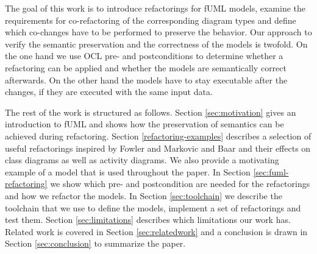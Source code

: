 \documentclass{llncs}
\begin{document}

The goal of this work is to introduce refactorings for fUML models, examine the requirements for co-refactoring of the
corresponding diagram types and define which co-changes have to be performed to preserve the behavior. Our approach to
verify the semantic preservation and the correctness of the models is twofold. On the one hand we use OCL pre- and postconditions
\cite{rob99} to determine whether a refactoring can be applied and whether the models are semantically correct afterwards.
On the other hand the models have to stay executable after the changes, if they are executed with the same input data.



The rest of the work is structured as follows. Section \ref{sec:motivation} gives an introduction to fUML and shows how 
the preservation of semantics can be achieved during refactoring. 
Section \ref{refactoring-examples} describes a selection of useful refactorings inspired by Fowler \cite{fow99} and 
Markovic and Baar \cite{DBLP:journals/sosym/MarkovicB08} and their effects on class diagrams as
well as activity diagrams. We also provide a motivating example of a model that is used throughout the paper. In Section 
\ref{sec:fuml-refactoring} we show which pre- and postcondition are needed for the refactorings and
how we refactor the models. In Section \ref{sec:toolchain} we describe the toolchain that we use to define the models, 
implement a set of refactorings and test them. Section \ref{sec:limitations} describes which limitations our work has. 
Related work is covered in Section \ref{sec:relatedwork} and a conclusion is drawn in 
Section \ref{sec:conclusion} to summarize the paper.


\end{document}
